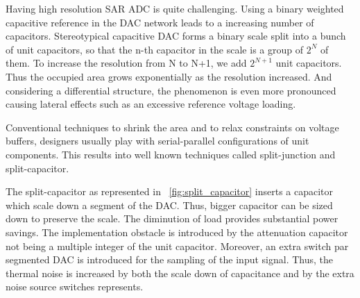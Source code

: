 Having high resolution SAR ADC is quite challenging. Using a binary weighted capacitive reference in the DAC network leads to a increasing number of capacitors. Stereotypical capacitive DAC forms a binary scale split into a bunch of unit capacitors, so that the n-th capacitor in the scale is a group of \(2^N\) of them. To increase the resolution from N to N+1, we add \(2^{N+1}\) unit capacitors. Thus the occupied area grows exponentially as the resolution increased. And considering a differential structure, the phenomenon is even more pronounced causing lateral effects such as an excessive reference voltage loading.

Conventional techniques to shrink the area and to relax constraints on voltage buffers, designers usually play with serial-parallel configurations of unit components. This results into well known techniques called split-junction and split-capacitor. 

The split-capacitor as represented in \figurename~\ref{fig:split_capacitor} inserts a capacitor which scale down a segment of the DAC\@. Thus, bigger capacitor can be sized down to preserve the scale. The diminution of load provides substantial power savings. The implementation obstacle is introduced by the attenuation capacitor not being a multiple integer of the unit capacitor. Moreover, an extra switch par segmented DAC is introduced for the sampling of the input signal. Thus, the thermal noise is increased by both the scale down of capacitance and by the extra noise source switches represents.

